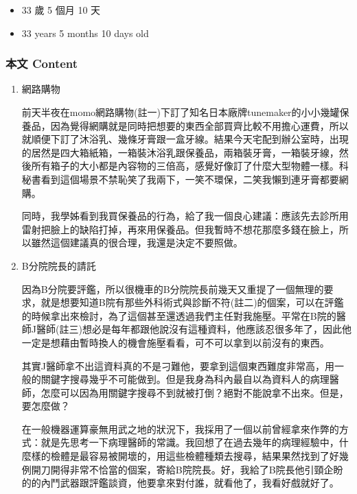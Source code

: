 \documentclass[
]{article}
\providecommand{\tightlist}{%
  \setlength{\itemsep}{0pt}\setlength{\parskip}{0pt}}
\begin{document}
\begin{itemize}
\tightlist
\item
  33 歲 5 個月 10 天
\item
  33 years 5 months 10 days old
\end{itemize}

\hypertarget{ux672cux6587-content-3}{%
\subsubsection{本文 Content}\label{ux672cux6587-content-3}}

\begin{enumerate}
\def\labelenumi{\arabic{enumi}.}
\item
  網路購物

  前天半夜在momo網路購物(註一)下訂了知名日本廠牌tunemaker的小小幾罐保養品，因為覺得網購就是同時把想要的東西全部買齊比較不用擔心運費，所以就順便下訂了沐浴乳、幾條牙膏跟一盒牙線。結果今天宅配到辦公室時，出現的居然是四大箱紙箱，一箱裝沐浴乳跟保養品，兩箱裝牙膏，一箱裝牙線，然後所有箱子的大小都是內容物的三倍高，感覺好像訂了什麼大型物體一樣。科秘書看到這個場景不禁恥笑了我兩下，一笑不環保，二笑我懶到連牙膏都要網購。

  同時，我學姊看到我買保養品的行為，給了我一個良心建議：應該先去診所用雷射把臉上的缺陷打掉，再來用保養品。但我暫時不想花那麼多錢在臉上，所以雖然這個建議真的很合理，我還是決定不要照做。
\item
  B分院院長的請託

  因為B分院要評鑑，所以很機車的B分院院長前幾天又重提了一個無理的要求，就是想要知道B院有那些外科術式與診斷不符(註二)的個案，可以在評鑑的時候拿出來檢討，為了這個甚至還透過我們主任對我施壓。平常在B院的醫師J醫師(註三)想必是每年都跟他說沒有這種資料，他應該忍很多年了，因此他一定是想藉由暫時換人的機會施壓看看，可不可以拿到以前沒有的東西。

  其實J醫師拿不出這資料真的不是刁難他，要拿到這個東西難度非常高，用一般的關鍵字搜尋幾乎不可能做到。但是我身為科內最自以為資料人的病理醫師，怎麼可以因為用關鍵字搜尋不到就被打倒？絕對不能說拿不出來。但是，要怎麼做？

  在一般機器運算豪無用武之地的狀況下，我採用了一個以前曾經拿來作弊的方式：就是先思考一下病理醫師的常識。我回想了在過去幾年的病理經驗中，什麼樣的檢體是最容易被開壞的，用這些檢體種類去搜尋，結果果然找到了好幾例開刀開得非常不恰當的個案，寄給B院院長。好，我給了B院長他引頸企盼的的內鬥武器跟評鑑談資，他要拿來對付誰，就看他了，我看好戲就好了。
\end{enumerate}
\end{document}
